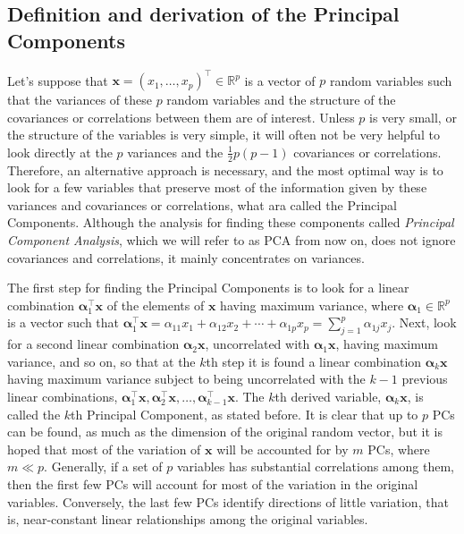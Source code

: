 \documentclass[11pt, oneside]{book}
\theoremstyle{plain}
\theoremstyle{remark}
\begin{document}
\subsection{Definition and derivation of the Principal
Components}\label{sec:def-algderivation}
Let's suppose that $\mathbf{x} = (x_1,\dots,x_p)^\top\in\mathbb{R}^p$
is a vector of $p$ random variables such that the variances of these $p$
random variables and the structure of the covariances or correlations between
them are of interest. Unless $p$ is very small, or the structure of the
variables is very simple, it will often not be very helpful to look directly at
the $p$ variances and the $\frac{1}{2}p(p-1)$ covariances or correlations.
Therefore, an alternative approach is necessary, and the most optimal way is to
look for a few variables that preserve most of the information given by these
variances and covariances or correlations, what ara called the Principal
Components. Although the analysis for finding these components called
\emph{Principal Component Analysis}, which we will refer to as PCA from now on,
does not ignore covariances and correlations, it mainly concentrates on
variances.

The first step for finding the Principal Components is to look for a linear
combination $\bm{\alpha}_1^\top\mathbf{x}$ of the elements of $\mathbf{x}$ having
maximum variance, where $\bm{\alpha}_1\in\mathbb{R}^p$ is a vector such that
$\bm{\alpha}_1^\top\mathbf{x} = \alpha_{11}x_1 + \alpha_{12}x_2 + \cdots +
\alpha_{1p}x_p = \sum_{j=1}^p\alpha_{1j}x_j.$ Next, look for a second linear
combination $\bm{\alpha}_2\mathbf{x}$, uncorrelated with
$\bm{\alpha}_1\mathbf{x}$, having maximum variance, and so on, so that at
the $k$th step it is found a linear combination $\bm{\alpha}_k\mathbf{x}$
having maximum variance subject to being uncorrelated with the $k-1$ previous
linear combinations, $\bm{\alpha}_1^\top\mathbf{x},
\bm{\alpha}_2^\top\mathbf{x}, \dots, \bm{\alpha}_{k-1}^\top\mathbf{x}.$ The
$k$th derived variable, $\bm{\alpha}_k\mathbf{x}$, is called the $k$th Principal
Component, as stated before. It is clear that up to $p$ PCs can be found, as
much as the dimension of the original random vector, but it is hoped that most
of the variation of $\mathbf{x}$ will be accounted for by $m$ PCs, where $m\ll
p$. Generally, if a set of $p$ variables has substantial correlations among
them, then the first few PCs will account for most of the variation in the
original variables.  Conversely, the last few PCs identify directions of little
variation, that is, near-constant linear relationships among the original
variables. 
\end{document}
